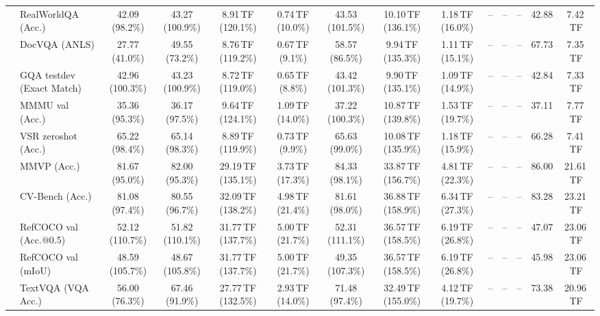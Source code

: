 \begin{table}[t]
\begin{center}
\begin{small}
\begin{sc}
{\begin{tabular}{llcccccccccccc}
& RealWorldQA (Acc.) & 42.09 (98.2\%) & 43.27 (100.9\%) & 8.91\,TF (120.1\%) & 0.74\,TF (10.0\%) & 43.53 (101.5\%) & 10.10\,TF (136.1\%) & 1.18\,TF (16.0\%) & -- & -- & -- & 42.88 & 7.42\,TF \\
& DocVQA (ANLS) & 27.77 (41.0\%) & 49.55 (73.2\%) & 8.76\,TF (119.2\%) & 0.67\,TF (9.1\%) & 58.57 (86.5\%) & 9.94\,TF (135.3\%) & 1.11\,TF (15.1\%) & -- & -- & -- & 67.73 & 7.35\,TF \\
& GQA testdev (Exact Match) & 42.96 (100.3\%) & 43.23 (100.9\%) & 8.72\,TF (119.0\%) & 0.65\,TF (8.8\%) & 43.42 (101.3\%) & 9.90\,TF (135.1\%) & 1.09\,TF (14.9\%) & -- & -- & -- & 42.84 & 7.33\,TF \\
& MMMU val (Acc.) & 35.36 (95.3\%) & 36.17 (97.5\%) & 9.64\,TF (124.1\%) & 1.09\,TF (14.0\%) & 37.22 (100.3\%) & 10.87\,TF (139.8\%) & 1.53\,TF (19.7\%) & -- & -- & -- & 37.11 & 7.77\,TF \\
& VSR zeroshot (Acc.) & 65.22 (98.4\%) & 65.14 (98.3\%) & 8.89\,TF (119.9\%) & 0.73\,TF (9.9\%) & 65.63 (99.0\%) & 10.08\,TF (135.9\%) & 1.18\,TF (15.9\%) & -- & -- & -- & 66.28 & 7.41\,TF \\
\midrule
{}
& MMVP (Acc.) & 81.67 (95.0\%) & 82.00 (95.3\%) & 29.19\,TF (135.1\%) & 3.73\,TF (17.3\%) & 84.33 (98.1\%) & 33.87\,TF (156.7\%) & 4.81\,TF (22.3\%) & -- & -- & -- & 86.00 & 21.61\,TF \\
& CV-Bench (Acc.) & 81.08 (97.4\%) & 80.55 (96.7\%) & 32.09\,TF (138.2\%) & 4.98\,TF (21.4\%) & 81.61 (98.0\%) & 36.88\,TF (158.9\%) & 6.34\,TF (27.3\%) & -- & -- & -- & 83.28 & 23.21\,TF \\
& RefCOCO val (Acc.@0.5) & 52.12 (110.7\%) & 51.82 (110.1\%) & 31.77\,TF (137.7\%) & 5.00\,TF (21.7\%) & 52.31 (111.1\%) & 36.57\,TF (158.5\%) & 6.19\,TF (26.8\%) & -- & -- & -- & 47.07 & 23.06\,TF \\
& RefCOCO val (mIoU) & 48.59 (105.7\%) & 48.67 (105.8\%) & 31.77\,TF (137.7\%) & 5.00\,TF (21.7\%) & 49.35 (107.3\%) & 36.57\,TF (158.5\%) & 6.19\,TF (26.8\%) & -- & -- & -- & 45.98 & 23.06\,TF \\
& TextVQA (VQA Acc.) & 56.00 (76.3\%) & 67.46 (91.9\%) & 27.77\,TF (132.5\%) & 2.93\,TF (14.0\%) & 71.48 (97.4\%) & 32.49\,TF (155.0\%) & 4.12\,TF (19.7\%) & -- & -- & -- & 73.38 & 20.96\,TF \\

\end{tabular}}
\end{sc}
\end{small}
\end{center}
\end{table}
